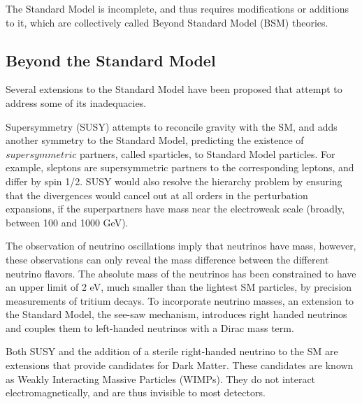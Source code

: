 \documentclass[11pt,a4paper,openright,twoside]{report}
\begin{document}
The Standard Model is incomplete, and thus requires modifications or additions to it, which are collectively called Beyond Standard Model (BSM) theories.

\subsection{Beyond the Standard Model}
Several extensions to the Standard Model have been proposed that attempt to address some of its inadequacies. 

Supersymmetry (SUSY) attempts to reconcile gravity with the SM, and adds another symmetry to the Standard Model, predicting the existence of $supersymmetric$ partners, called sparticles, to Standard Model particles. For example, sleptons are supersymmetric partners to the corresponding leptons, and differ by spin 1/2. SUSY would also resolve the hierarchy problem by ensuring that the divergences would cancel out at all orders in the perturbation expansions, if the superpartners have mass near the electroweak scale (broadly, between 100 and 1000 GeV).

The observation of neutrino oscillations imply that neutrinos have mass, however, these observations can only reveal the mass difference between the different neutrino flavors. The absolute mass of the neutrinos has been constrained to have an upper limit of 2 eV, much smaller than the lightest SM particles, by precision measurements of tritium decays. To incorporate neutrino masses, an extension to the Standard Model, the see-saw mechanism, introduces right handed neutrinos and couples them to left-handed neutrinos with a Dirac mass term.

Both SUSY and the addition of a sterile right-handed neutrino to the SM are extensions that provide candidates for Dark Matter. These candidates are known as Weakly Interacting Massive Particles (WIMPs). They do not interact electromagnetically, and are thus invisible to most detectors.
\end{document}

